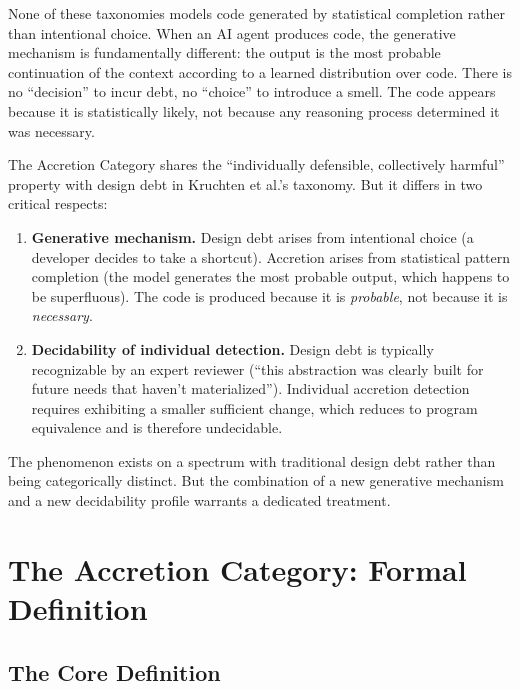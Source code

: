 \documentclass[11pt, a4paper, copyright]{googledeepmind}
\begin{document}
None of these taxonomies models code generated by statistical completion rather than intentional choice. When an AI agent produces code, the generative mechanism is fundamentally different: the output is the most probable continuation of the context according to a learned distribution over code. There is no ``decision'' to incur debt, no ``choice'' to introduce a smell. The code appears because it is statistically likely, not because any reasoning process determined it was necessary.

The Accretion Category shares the ``individually defensible, collectively harmful'' property with design debt in Kruchten et al.'s taxonomy. But it differs in two critical respects:

\begin{enumerate}[nosep]
    \item \textbf{Generative mechanism.} Design debt arises from intentional choice (a developer decides to take a shortcut). Accretion arises from statistical pattern completion (the model generates the most probable output, which happens to be superfluous). The code is produced because it is \emph{probable}, not because it is \emph{necessary}.
    \item \textbf{Decidability of individual detection.} Design debt is typically recognizable by an expert reviewer (``this abstraction was clearly built for future needs that haven't materialized''). Individual accretion detection requires exhibiting a smaller sufficient change, which reduces to program equivalence and is therefore undecidable.
\end{enumerate}

The phenomenon exists on a spectrum with traditional design debt rather than being categorically distinct. But the combination of a new generative mechanism and a new decidability profile warrants a dedicated treatment.


\section{The Accretion Category: Formal Definition}
\label{sec:formal}

\subsection{The Core Definition}
\end{document}
